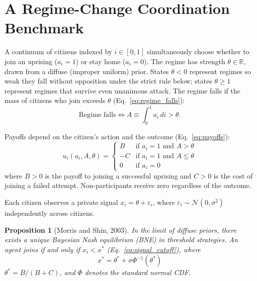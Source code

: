 \documentclass[12pt]{article}
\newtheorem{proposition}{Proposition}
\begin{document}
\section{A Regime-Change Coordination Benchmark} \label{sec:model}

A continuum of citizens indexed by $i \in [0,1]$ simultaneously choose whether to join an uprising ($a_i = 1$) or stay home ($a_i = 0$). The regime has strength $\theta \in \mathbb{R}$, drawn from a diffuse (improper uniform) prior. States $\theta < 0$ represent regimes so weak they fall without opposition under the strict rule below; states $\theta \geq 1$ represent regimes that survive even unanimous attack. The regime falls if the mass of citizens who join exceeds $\theta$ (Eq.~\ref{eq:regime_falls}):
\begin{equation}
    \text{Regime falls} \iff A \equiv \int_0^1 a_i \, di > \theta.
    \label{eq:regime_falls}
\end{equation}

Payoffs depend on the citizen's action and the outcome (Eq.~\ref{eq:payoffs}):
\begin{equation}
    u_i(a_i, A, \theta) = \begin{cases}
        B & \text{if } a_i = 1 \text{ and } A > \theta \\
        -C & \text{if } a_i = 1 \text{ and } A \leq \theta \\
        0 & \text{if } a_i = 0
    \end{cases}
    \label{eq:payoffs}
\end{equation}
where $B > 0$ is the payoff to joining a successful uprising and $C > 0$ is the cost of joining a failed attempt. Non-participants receive zero regardless of the outcome.

Each citizen observes a private signal $x_i = \theta + \varepsilon_i$, where $\varepsilon_i \sim \mathcal{N}(0, \sigma^2)$ independently across citizens.

\begin{proposition}[Morris and Shin, 2003]\label{prop:ms}
In the limit of diffuse priors, there exists a unique Bayesian Nash equilibrium (BNE) in threshold strategies. An agent joins if and only if $x_i < x^*$ (Eq.~\ref{eq:signal_cutoff}), where
\begin{equation}
    x^* = \theta^* + \sigma \Phi^{-1}(\theta^*)
    \label{eq:signal_cutoff}
\end{equation}
$\theta^* = B/(B+C)$, and $\Phi$ denotes the standard normal CDF.
\end{proposition}
\end{document}
